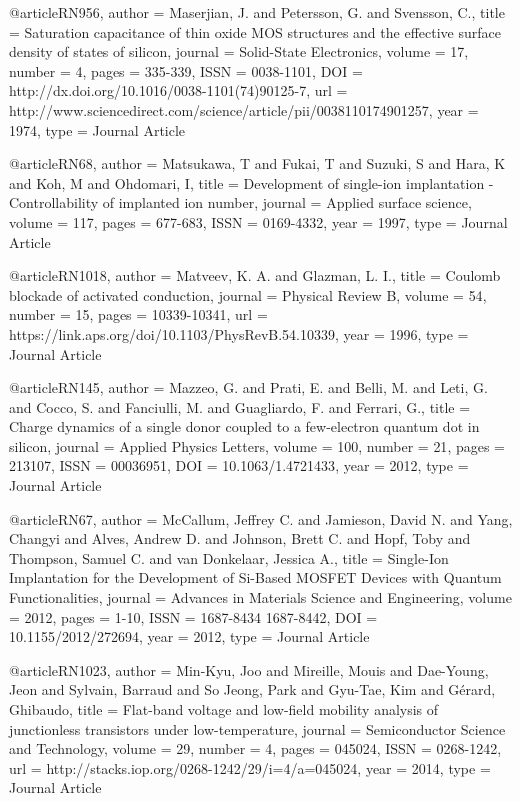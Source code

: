 @article{RN956,
   author = {Maserjian, J. and Petersson, G. and Svensson, C.},
   title = {Saturation capacitance of thin oxide MOS structures and the effective surface density of states of silicon},
   journal = {Solid-State Electronics},
   volume = {17},
   number = {4},
   pages = {335-339},
   ISSN = {0038-1101},
   DOI = {http://dx.doi.org/10.1016/0038-1101(74)90125-7},
   url = {http://www.sciencedirect.com/science/article/pii/0038110174901257},
   year = {1974},
   type = {Journal Article}
}

@article{RN68,
   author = {Matsukawa, T and Fukai, T and Suzuki, S and Hara, K and Koh, M and Ohdomari, I},
   title = {Development of single-ion implantation - Controllability of implanted ion number},
   journal = {Applied surface science},
   volume = {117},
   pages = {677-683},
   ISSN = {0169-4332},
   year = {1997},
   type = {Journal Article}
}

@article{RN1018,
   author = {Matveev, K. A. and Glazman, L. I.},
   title = {Coulomb blockade of activated conduction},
   journal = {Physical Review B},
   volume = {54},
   number = {15},
   pages = {10339-10341},
   url = {https://link.aps.org/doi/10.1103/PhysRevB.54.10339},
   year = {1996},
   type = {Journal Article}
}

@article{RN145,
   author = {Mazzeo, G. and Prati, E. and Belli, M. and Leti, G. and Cocco, S. and Fanciulli, M. and Guagliardo, F. and Ferrari, G.},
   title = {Charge dynamics of a single donor coupled to a few-electron quantum dot in silicon},
   journal = {Applied Physics Letters},
   volume = {100},
   number = {21},
   pages = {213107},
   ISSN = {00036951},
   DOI = {10.1063/1.4721433},
   year = {2012},
   type = {Journal Article}
}

@article{RN67,
   author = {McCallum, Jeffrey C. and Jamieson, David N. and Yang, Changyi and Alves, Andrew D. and Johnson, Brett C. and Hopf, Toby and Thompson, Samuel C. and van Donkelaar, Jessica A.},
   title = {Single-Ion Implantation for the Development of Si-Based MOSFET Devices with Quantum Functionalities},
   journal = {Advances in Materials Science and Engineering},
   volume = {2012},
   pages = {1-10},
   ISSN = {1687-8434
1687-8442},
   DOI = {10.1155/2012/272694},
   year = {2012},
   type = {Journal Article}
}

@article{RN1023,
   author = {Min-Kyu, Joo and Mireille, Mouis and Dae-Young, Jeon and Sylvain, Barraud and So Jeong, Park and Gyu-Tae, Kim and Gérard, Ghibaudo},
   title = {Flat-band voltage and low-field mobility analysis of junctionless transistors under low-temperature},
   journal = {Semiconductor Science and Technology},
   volume = {29},
   number = {4},
   pages = {045024},
   ISSN = {0268-1242},
   url = {http://stacks.iop.org/0268-1242/29/i=4/a=045024},
   year = {2014},
   type = {Journal Article}
}

